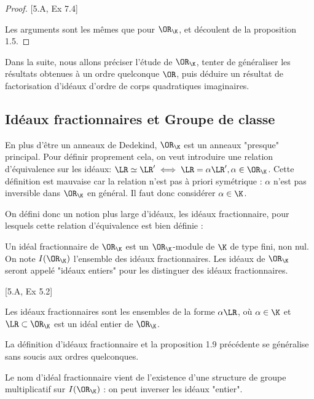 \begin{proof}\cite{Cox}[5.A, Ex 7.4]
	
	Les arguments sont les mêmes que pour $\OR_{\K}$, et découlent de la proposition 1.5.
\end{proof}

Dans la suite, nous allons préciser l'étude de $\OR_{\K}$, tenter de généraliser les résultats obtenues à un ordre quelconque $\OR$, puis déduire un résultat de factorisation d'idéaux d'ordre de corps quadratiques imaginaires. 







\subsection{Idéaux fractionnaires et Groupe de classe}

En plus d'être un anneaux de Dedekind, $\OR_{\K}$ est un anneaux "presque" principal. Pour définir proprement cela, on veut introduire une relation d'équivalence sur les idéaux: $\LR\simeq\LR'\iff\LR = \alpha\LR',\alpha\in\OR_{\K}$. Cette définition est mauvaise car la relation n'est pas à priori symétrique : $\alpha$ n'est pas inversible dans $\OR_{\K}$ en général. Il faut donc considérer $\alpha\in\K$.

On défini donc un notion plus large d'idéaux, les idéaux fractionnaire, pour lesquels cette relation d'équivalence est bien définie :

\begin{Def}
	Un idéal fractionnaire de $\OR_{\K}$ est un $\OR_{\K}$-module de $\K$ de type fini, non nul. On note $I(\OR_{\K})$ l'ensemble des idéaux fractionnaires. Les idéaux de $\OR_{\K}$ seront appelé "idéaux entiers" pour les distinguer des idéaux fractionnaires. 
\end{Def}

\begin{Prop}\cite{Cox}[5.A, Ex 5.2]
	
	Les idéaux fractionnaires sont les ensembles de la forme $\alpha\LR$, où $\alpha\in\K$ et $\LR\subset\OR_{\K}$ est un idéal entier de $\OR_{\K}$.
\end{Prop}

\begin{Rem}
	La définition d'idéaux fractionnaire et la proposition 1.9 précédente se généralise sans soucis aux ordres quelconques. 
\end{Rem}


Le nom d'idéal fractionnaire vient de l'existence d'une structure de groupe multiplicatif sur $I(\OR_{\K})$ : on peut inverser les idéaux "entier". 

